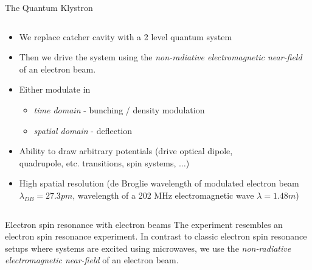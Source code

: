 \documentclass[final]{beamer}
\begin{document}
\begin{frame}[fragile]{}
\begin{columns}[T]
\begin{column}{.49\linewidth}
\begin{block}{\large The Quantum Klystron}
\begin{columns}
\begin{column}{0.6\columnwidth}
            \begin{itemize}
              \item We replace catcher cavity with a 2 level quantum system
              \item Then we drive the system using the \textit{non-radiative electromagnetic near-field}
                    of an electron beam.
              \item Either modulate in
              \begin{itemize}
                  \item \textit{time domain} - bunching / density modulation
                  \item \textit{spatial domain} - deflection
              \end{itemize}
              \item Ability to draw arbitrary potentials (drive optical dipole, \\quadrupole, etc. transitions, spin systems, $\ldots$)
              \item High spatial resolution (de Broglie wavelength of modulated electron beam $\lambda_{DB}= 27.3 pm$, wavelength of a 202 MHz electromagnetic wave $\lambda=1.48m$)
            \end{itemize}
          \end{column}
        \end{columns}
      \end{block}

      \begin{block}{\large Electron spin resonance with electron beams}
        The experiment resembles an electron spin resonance experiment. In contrast to
        classic electron spin resonance setups where systems are excited using microwaves,
        we use the \textit{non-radiative electromagnetic near-field} of an electron beam.


\end{block}
\end{column}
\end{columns}
\end{frame}
\end{document}
